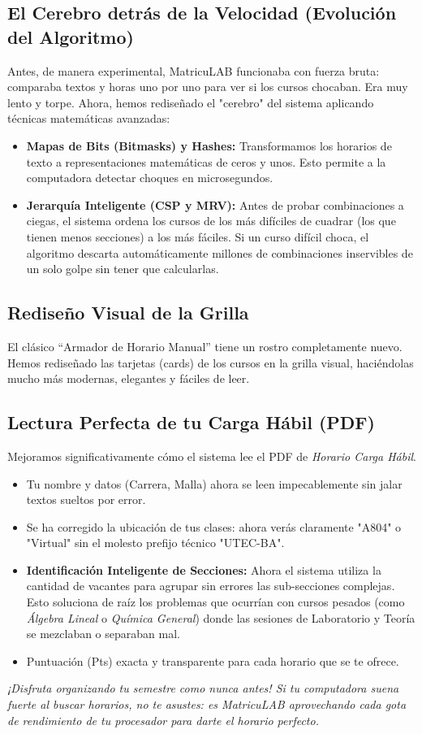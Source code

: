 \documentclass[12pt,a4paper]{article}
\begin{document}
\subsection{El Cerebro detrás de la Velocidad (Evolución del Algoritmo)}
Antes, de manera experimental, MatricuLAB funcionaba con fuerza bruta: comparaba textos y horas uno por uno para ver si los cursos chocaban. Era muy lento y torpe.
Ahora, hemos rediseñado el "cerebro" del sistema aplicando técnicas matemáticas avanzadas:
\begin{itemize}[label=\textcolor{blue}{\textbullet}]
    \item \textbf{Mapas de Bits (Bitmasks) y Hashes:} Transformamos los horarios de texto a representaciones matemáticas de ceros y unos. Esto permite a la computadora detectar choques en microsegundos.
    \item \textbf{Jerarquía Inteligente (CSP y MRV):} Antes de probar combinaciones a ciegas, el sistema ordena los cursos de los más difíciles de cuadrar (los que tienen menos secciones) a los más fáciles. Si un curso difícil choca, el algoritmo descarta automáticamente millones de combinaciones inservibles de un solo golpe sin tener que calcularlas.
\end{itemize}

\subsection{Rediseño Visual de la Grilla}
El clásico ``Armador de Horario Manual'' tiene un rostro completamente nuevo. Hemos rediseñado las tarjetas (cards) de los cursos en la grilla visual, haciéndolas mucho más modernas, elegantes y fáciles de leer.

\subsection{Lectura Perfecta de tu Carga Hábil (PDF)}
Mejoramos significativamente cómo el sistema lee el PDF de \textit{Horario Carga Hábil}.
\begin{itemize}[label=\textcolor{blue}{\textbullet}]
    \item Tu nombre y datos (Carrera, Malla) ahora se leen impecablemente sin jalar textos sueltos por error.
    \item Se ha corregido la ubicación de tus clases: ahora verás claramente "A804" o "Virtual" sin el molesto prefijo técnico "UTEC-BA".
    \item \textbf{Identificación Inteligente de Secciones:} Ahora el sistema utiliza la cantidad de vacantes para agrupar sin errores las sub-secciones complejas. Esto soluciona de raíz los problemas que ocurrían con cursos pesados (como \textit{Álgebra Lineal} o \textit{Química General}) donde las sesiones de Laboratorio y Teoría se mezclaban o separaban mal.
    \item Puntuación (Pts) exacta y transparente para cada horario que se te ofrece.
\end{itemize}

\vspace{1cm}
\noindent \textit{¡Disfruta organizando tu semestre como nunca antes! Si tu computadora suena fuerte al buscar horarios, no te asustes: es MatricuLAB aprovechando cada gota de rendimiento de tu procesador para darte el horario perfecto.}
\end{document}
